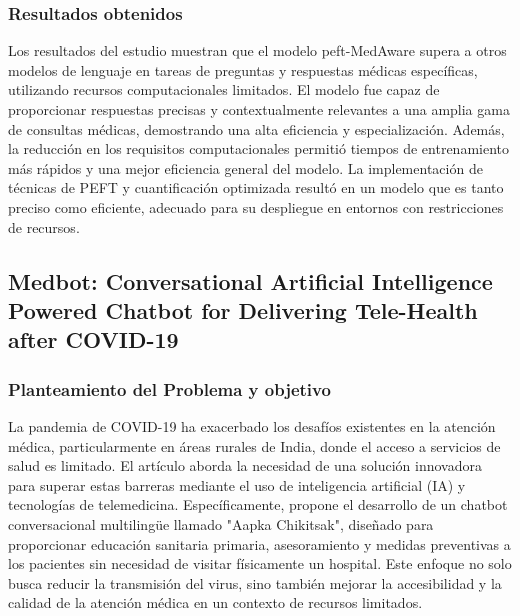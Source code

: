 	
		\subsubsection{Resultados obtenidos}
			Los resultados del estudio muestran que el modelo peft-MedAware supera a otros modelos de lenguaje en tareas de preguntas y respuestas médicas específicas, utilizando recursos computacionales limitados. El modelo fue capaz de proporcionar respuestas precisas y contextualmente relevantes a una amplia gama de consultas médicas, demostrando una alta eficiencia y especialización. Además, la reducción en los requisitos computacionales permitió tiempos de entrenamiento más rápidos y una mejor eficiencia general del modelo. La implementación de técnicas de PEFT y cuantificación optimizada resultó en un modelo que es tanto preciso como eficiente, adecuado para su despliegue en entornos con restricciones de recursos.


\subsection{Medbot: Conversational Artificial Intelligence Powered Chatbot for Delivering Tele-Health after COVID-19} %
		\subsubsection{Planteamiento del Problema y objetivo}
		La pandemia de COVID-19 ha exacerbado los desafíos existentes en la atención médica, particularmente en áreas rurales de India, donde el acceso a servicios de salud es limitado. El artículo aborda la necesidad de una solución innovadora para superar estas barreras mediante el uso de inteligencia artificial (IA) y tecnologías de telemedicina. Específicamente, propone el desarrollo de un chatbot conversacional multilingüe llamado "Aapka Chikitsak", diseñado para proporcionar educación sanitaria primaria, asesoramiento y medidas preventivas a los pacientes sin necesidad de visitar físicamente un hospital. Este enfoque no solo busca reducir la transmisión del virus, sino también mejorar la accesibilidad y la calidad de la atención médica en un contexto de recursos limitados.
		
